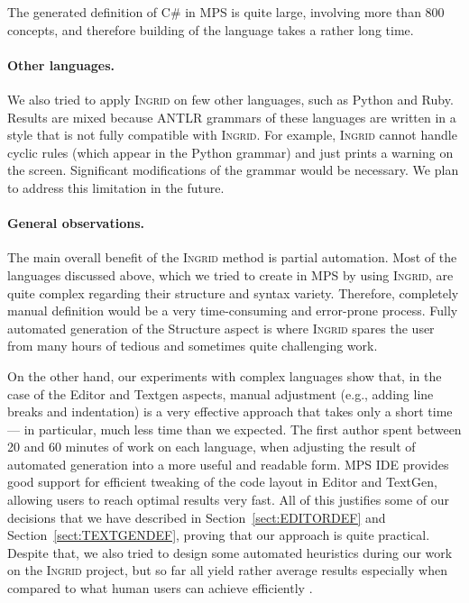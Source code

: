 The generated definition of C\# in MPS is quite large, involving more than 800 concepts, and therefore building of the language takes a rather long time.

\paragraph{Other languages.}
We also tried to apply \textsc{Ingrid} on few other languages, such as Python and Ruby.
Results are mixed because ANTLR grammars of these languages are written in a style that is not fully compatible with \textsc{Ingrid}.
For example, \textsc{Ingrid} cannot handle cyclic rules (which appear in the Python grammar) and just prints a warning on the screen.
Significant modifications of the grammar would be necessary.
We plan to address this limitation in the future.

\paragraph{General observations.}
The main overall benefit of the \textsc{Ingrid} method is partial automation.
Most of the languages discussed above, which we tried to create in MPS by using \textsc{Ingrid}, are quite complex regarding their structure and syntax variety.
Therefore, completely manual definition would be a very time-consuming and error-prone process.
Fully automated generation of the Structure aspect is where \textsc{Ingrid} spares the user from many hours of tedious and sometimes quite challenging work.

On the other hand, our experiments with complex languages show that, in the case of the Editor and Textgen aspects, manual adjustment (e.g., adding line breaks and indentation) is a very effective approach that takes only a short time --- in particular, much less time than we expected.
The first author spent between 20 and 60 minutes of work on each language, when adjusting the result of automated generation into a more useful and readable form.
MPS IDE provides good support for efficient tweaking of the code layout in Editor and TextGen, allowing users to reach optimal results very fast.
All of this justifies some of our decisions that we have described in Section~\ref{sect:EDITORDEF} and Section~\ref{sect:TEXTGENDEF}, proving that our approach is quite practical.
Despite that, we also tried to design some automated heuristics during our work on the \textsc{Ingrid} project, but so far all yield rather average results especially when compared to what human users can achieve efficiently .

